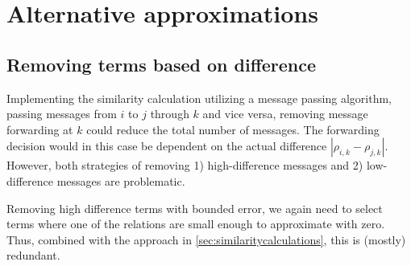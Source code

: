 \documentclass{sig-alternate}
\newcommand{\rn}[1]{\rho_{#1}}
\begin{document}
\newpage



\balancecolumns
\appendix



\section{Alternative approximations}

\subsection{Removing terms based on difference}

Implementing the similarity calculation utilizing a message passing algorithm, passing messages from $i$ to $j$
through $k$ and vice versa, removing message forwarding at $k$ could reduce the total number of messages.
The forwarding decision would in this case be dependent on the
actual difference $|\rn{i,k}-\rn{j,k}|$. However, both strategies of removing 1) high-difference messages and 2)
low-difference messages are problematic.

Removing high difference terms with bounded error, we again need to select terms where one of the relations
are small enough to approximate with zero.
Thus, combined with the approach in \ref{sec:similaritycalculations}, this is (mostly) redundant.
\end{document}
